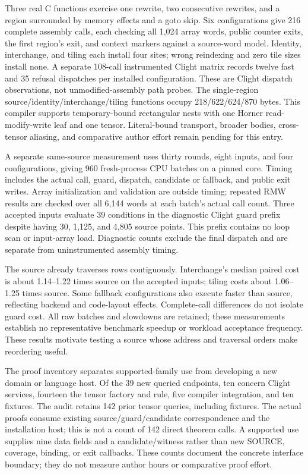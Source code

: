 Three real C functions exercise one rewrite, two consecutive rewrites, and a
region surrounded by memory effects and a goto skip. Six configurations give
216 complete assembly calls, each checking all 1,024 array words, public counter
exits, the first region's exit, and context markers against a source-word model.
Identity, interchange, and tiling each install four sites; wrong reindexing and
zero tile sizes install none. A separate 108-call instrumented Clight matrix
records twelve fast and 35 refusal dispatches per installed configuration.
These are Clight dispatch observations, not unmodified-assembly path probes.
The single-region source/identity/interchange/tiling functions occupy
218/622/624/870 bytes. This compiler supports temporary-bound rectangular nests
with one Horner read-modify-write leaf and one tensor. Literal-bound transport,
broader bodies, cross-tensor aliasing, and comparative author effort
remain pending for this entry.

A separate same-source measurement uses thirty rounds, eight inputs, and four
configurations, giving 960 fresh-process CPU batches on a pinned core. Timing
includes the actual call, guard, dispatch, candidate or fallback, and public
exit writes. Array initialization and validation are outside timing; repeated
RMW results are checked over all 6,144 words at each batch's actual call count.
Three accepted inputs evaluate 39 conditions in the diagnostic Clight guard
prefix despite having 30, 1,125, and 4,805 source points. This prefix contains no
loop scan or input-array load. Diagnostic counts exclude the final dispatch and
are separate from uninstrumented assembly timing.

The source already traverses rows contiguously. Interchange's median paired
cost is about 1.14--1.22 times source on the accepted inputs; tiling costs about
1.06--1.25 times source. Some fallback configurations also execute faster than
source, reflecting backend and code-layout effects. Complete-call differences
do not isolate guard cost. All raw batches and slowdowns are retained; these
measurements establish no representative benchmark speedup or workload
acceptance frequency. These results motivate testing a source whose address
and traversal orders make reordering useful.

The proof inventory separates supported-family use from developing a new domain
or language host. Of the 39 new queried endpoints, ten concern Clight services,
fourteen the tensor factory and rule, five compiler integration, and ten
fixtures. The audit retains 142 prior tensor queries,
including fixtures. The actual proofs consume existing source/guard/candidate
correspondence and the installation host; this is not a count of 142 direct
theorem calls. A supported use supplies nine
data fields and a candidate/witness rather than new SOURCE, coverage, binding,
or exit callbacks. These counts document the concrete interface boundary;
they do not measure author hours or comparative proof effort.

